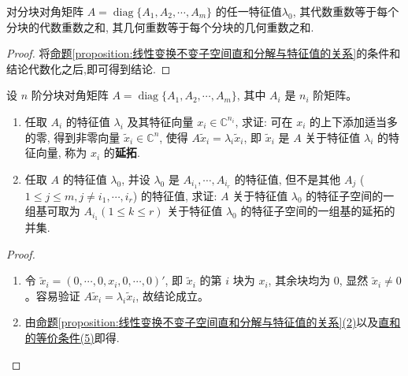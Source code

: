 \documentclass[../../main.tex]{subfiles}%
\begin{document}
\begin{corollary}\label{corollary:分块准对角矩阵的任一特征值的代数重数与几何重数}
对分块对角矩阵 $A = \operatorname{diag}\{A_1, A_2, \cdots, A_m\}$ 的任一特征值$\lambda_0$, 其代数重数等于每个分块的代数重数之和, 其几何重数等于每个分块的几何重数之和.
\end{corollary}
\begin{proof}

将\hyperref[proposition:线性变换不变子空间直和分解与特征值的关系]{命题\ref{proposition:线性变换不变子空间直和分解与特征值的关系}}的条件和结论代数化之后,即可得到结论.

\end{proof}

\begin{proposition}[特征向量的延拓]\label{proposition:特征向量的延拓}
设 $n$ 阶分块对角矩阵 $A = \operatorname{diag}\{A_1, A_2, \cdots, A_m\}$, 其中 $A_i$ 是 $n_i$ 阶矩阵。
\begin{enumerate}[(1)]
\item 任取 $A_i$ 的特征值 $\lambda_i$ 及其特征向量 $x_i \in \mathbb{C}^{n_i}$, 求证: 可在 $x_i$ 的上下添加适当多的零, 得到非零向量 $\tilde{x}_i \in \mathbb{C}^n$, 使得 $A \tilde{x}_i = \lambda_i \tilde{x}_i$, 即 $\tilde{x}_i$ 是 $A$ 关于特征值 $\lambda_i$ 的特征向量, 称为 $x_i$ 的\textbf{延拓}.

\item 任取 $A$ 的特征值 $\lambda_0$, 并设 $\lambda_0$ 是 $A_{i_1}, \cdots, A_{i_r}$ 的特征值, 但不是其他 $A_j$ ($1 \leqslant  j \leqslant  m, j \neq i_1, \cdots, i_r$) 的特征值, 求证: $A$ 关于特征值 $\lambda_0$ 的特征子空间的一组基可取为 $A_{i_1} (1 \leqslant  k \leqslant  r)$ 关于特征值 $\lambda_0$ 的特征子空间的一组基的延拓的并集.
\end{enumerate} 
\end{proposition}
\begin{proof}
\begin{enumerate}[(1)]
\item 令 $\tilde{x}_i = (0, \cdots, 0, x_i, 0, \cdots, 0)'$, 即 $\tilde{x}_i$ 的第 $i$ 块为 $x_i$, 其余块均为 $0$, 显然 $\tilde{x}_i \neq 0$。容易验证 $A \tilde{x}_i = \lambda_i \tilde{x}_i$, 故结论成立。

\item 由\hyperref[proposition:线性变换不变子空间直和分解与特征值的关系]{命题\ref{proposition:线性变换不变子空间直和分解与特征值的关系}(2)}以及\hyperref[theorem:直和的等价条件]{直和的等价条件(5)}即得.
\end{enumerate}

\end{proof}
\end{document}
